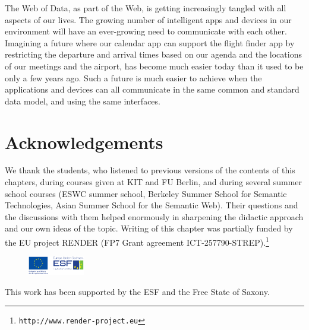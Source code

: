 \documentclass{IOS-Book-Article}
\begin{document}
The Web of Data, as part of the Web, is getting increasingly tangled with all aspects of our lives.
The growing number of intelligent apps and devices in our environment will have an ever-growing need to communicate with each other.
Imagining a future where our calendar app can support the flight finder app by restricting the departure and arrival times based on our agenda and the locations of our meetings and the airport, has become much easier today than it used to be only a few years ago.
Such a future is much easier to achieve when the applications and devices can all communicate in the same common and standard data model, and using the same interfaces.

\section*{Acknowledgements}

We thank the students, who listened to previous versions of the contents of this chapters, during courses given at KIT and FU Berlin, and during several summer school courses (ESWC summer school, Berkeley Summer School for Semantic Technologies, Asian Summer School for the Semantic Web).
Their questions and the discussions with them helped enormously in sharpening the didactic approach and our own ideas of the topic.
Writing of this chapter was partially funded by the EU project RENDER (FP7 Grant agreement ICT-257790-STREP).\footnote{\texttt{http://www.render-project.eu}}
\begin{figure}
 \vspace{-4mm}
 \includegraphics[width=0.22\textwidth]{esf.pdf}
\end{figure}
This work has been supported by the ESF and the Free State of Saxony.

\normalfont



\end{document}

